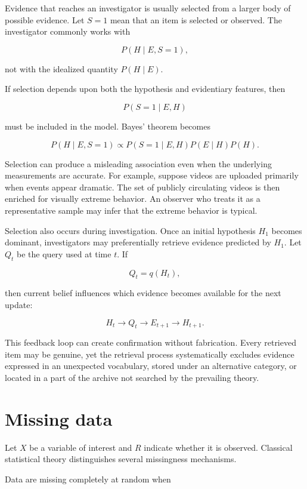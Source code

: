 Evidence that reaches an investigator is usually selected from a larger body of possible evidence. Let \(S=1\) mean that an item is selected or observed. The investigator commonly works with

\[
P(H\mid E,S=1),
\]

not with the idealized quantity \(P(H\mid E)\).

If selection depends upon both the hypothesis and evidentiary features, then

\[
P(S=1\mid E,H)
\]

must be included in the model. Bayes' theorem becomes

\[
P(H\mid E,S=1)
\propto
P(S=1\mid E,H)P(E\mid H)P(H).
\]

Selection can produce a misleading association even when the underlying measurements are accurate. For example, suppose videos are uploaded primarily when events appear dramatic. The set of publicly circulating videos is then enriched for visually extreme behavior. An observer who treats it as a representative sample may infer that the extreme behavior is typical.

Selection also occurs during investigation. Once an initial hypothesis \(H_1\) becomes dominant, investigators may preferentially retrieve evidence predicted by \(H_1\). Let \(Q_t\) be the query used at time \(t\). If

\[
Q_t=q(H_t),
\]

then current belief influences which evidence becomes available for the next update:

\[
H_t\longrightarrow Q_t\longrightarrow E_{t+1}
\longrightarrow H_{t+1}.
\]

This feedback loop can create confirmation without fabrication. Every retrieved item may be genuine, yet the retrieval process systematically excludes evidence expressed in an unexpected vocabulary, stored under an alternative category, or located in a part of the archive not searched by the prevailing theory.

\section{Missing data}
\label{sec:a10}

Let \(X\) be a variable of interest and \(R\) indicate whether it is observed. Classical statistical theory distinguishes several missingness mechanisms.

Data are missing completely at random when

